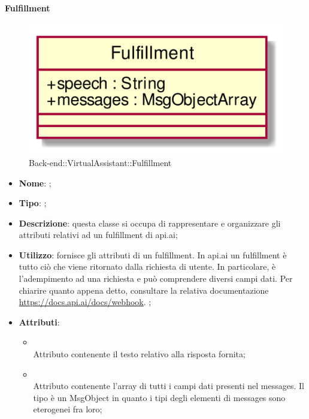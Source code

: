 \hypertarget{Fulfillment_label}{\paragraph{Fulfillment}}
\begin{figure}[h]
	\centering
	\includegraphics[width=\textwidth,height=\textheight,keepaspectratio]{images/ClassFulfillment.png}
	\caption{Back-end::VirtualAssistant::Fulfillment}
\end{figure}
\begin{itemize}
	\item \textbf{Nome}: ;
	\item \textbf{Tipo}: ;
	\item \textbf{Descrizione}: questa classe si occupa di rappresentare e organizzare gli attributi relativi ad un fulfillment di api.ai;
	\item \textbf{Utilizzo}: fornisce gli attributi di un fulfillment.
In api.ai un fulfillment è tutto ciò che viene ritornato dalla richiesta di utente. In particolare, è l'adempimento ad una richiesta e può comprendere diversi campi dati.
Per chiarire quanto appena detto, consultare la relativa documentazione \url{https://docs.api.ai/docs/webhook}.
;
	\item \textbf{Attributi}:
	\begin{itemize}
		\item[]  \\
		Attributo contenente il testo relativo alla risposta fornita;
		\item[]  \\
		Attributo contenente l'array di tutti i campi dati presenti nel messages.
Il tipo è un MsgObject in quanto i tipi degli elementi di messages sono eterogenei fra loro;
	\end{itemize}
\end{itemize}
\FloatBarrier

